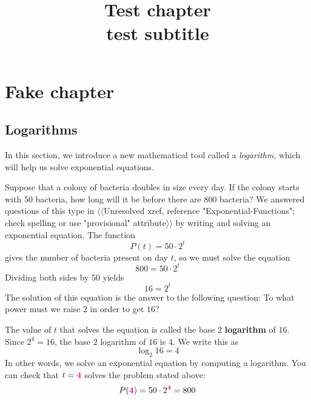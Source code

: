 \documentclass[10pt,]{book}
\title{Test chapter\\
{\large test subtitle}}
\author{}
\date{}
\newcommand{\terminology}[1]{\textbf{#1}}
\theoremstyle{plain}
\theoremstyle{definition}
\theoremstyle{definition}
\theoremstyle{definition}
\newcommand{\alert}[1]{\mathbf{\color{magenta}{#1}}}
\begin{document}
\typeout{************************************************}
\typeout{************************************************}
\chapter[Fake chapter]{Fake chapter}\label{testchap}
\typeout{************************************************}
\typeout{************************************************}
\typeout{************************************************}
\typeout{************************************************}
\section[Logarithms]{Logarithms}\label{Logarithms}

	In this section, we introduce a new mathematical tool called a \emph{logarithm}, which will help us solve exponential equations.
%
\par

	Suppose that a colony of bacteria doubles in size every day. If the colony starts with \(50\) bacteria, how long will it be before there are \(800\) bacteria? We answered questions of this type in {$\langle\langle$Unresolved xref, reference "Exponential-Functions"; check spelling or use "provisional" attribute$\rangle\rangle$} by writing and solving an exponential equation. The function
	\begin{equation*}P(t) = 50 \cdot 2^t\end{equation*}
	gives the number of bacteria present on day \(t\), so we must solve the equation
	\begin{equation*}800 = 50 \cdot 2^t\end{equation*}
	Dividing both sides by 50 yields
	\begin{equation*}16 = 2^t\end{equation*}
	The solution of this equation is the answer to the following question: To what power must we raise \(2\) in order to get \(16\)?
%
\par

	The value of \(t\) that solves the equation is called the base \(2\) \terminology{logarithm} of \(16\). Since \(2^4 = 16\), the base \(2\) logarithm of \(16\) is \(4\). We write this as
	\begin{equation*}\log_{2}16 = 4\end{equation*}
	In other words, we solve an exponential equation by computing a logarithm. You can check that \(t = \alert{4}\)
	solves the problem stated above:
	\begin{equation*}P(\alert{4}) = 50 \cdot 2^\alert{4}= 800\end{equation*}
%
\par
\end{document}
